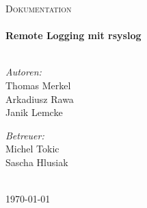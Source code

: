 \begin{titlepage}
	\begin{center}
	\textsc{\LARGE Dokumentation}\\[1.5cm]
	\HRule \\[0.4cm]
		{\huge \bfseries Remote Logging mit rsyslog}\\[0.4cm]
	\HRule \\[1.4cm]

	\begin{minipage}{0.4\textwidth}
		\begin{flushleft}
			\large
			\emph{Autoren:}\\
			Thomas Merkel\\
			Arkadiusz Rawa\\
			Janik Lemcke
		\end{flushleft}
	\end{minipage}
	\begin{minipage}{0.4\textwidth}
		\begin{flushright}
			\large
			\emph{Betreuer:}\\
			Michel Tokic\\
			Sascha Hlusiak\\
			\ 
		\end{flushright}
	\end{minipage}
	\vfill
	{\large \today}
	\end{center}
\end{titlepage}